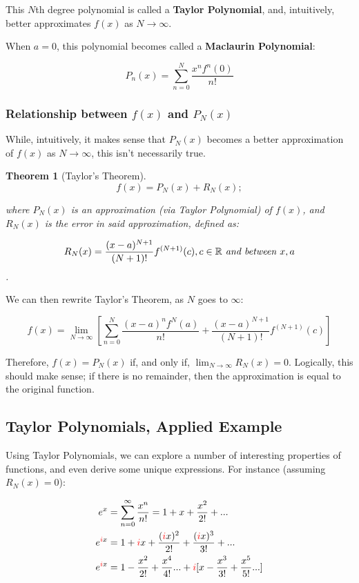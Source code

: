 \documentclass[12pt]{article}
\newtheorem*{theorem}{Theorem}
\begin{document}
This $N$th degree polynomial is called a \textbf{Taylor Polynomial}, and, intuitively, better approximates $f(x)$ as $N \to \infty$.

When $a = 0$, this polynomial becomes called a \textbf{Maclaurin Polynomial}:

$$P_n(x) = \sum_{n=0}^{N} \frac{x^n f^n(0)}{n!}$$

\subsubsection{Relationship between \texorpdfstring{$f(x)$}{a function} and \texorpdfstring{$P_N(x)$}{its approximation}}

While, intuitively, it makes sense that $P_N(x)$ becomes a better approximation of $f(x)$ as $N\to\infty$, this isn't necessarily true.

\begin{theorem}[Taylor's Theorem]
$$f(x) = P_N(x) + R_N(x);$$

where $P_N(x)$ is an approximation (via Taylor Polynomial) of $f(x)$, and $R_N(x)$ is the error in said approximation, defined as:

$$R_N(x) = \frac{(x-a)^{N+1}}{(N+1)!}f^{(N+1)}(c), c \in \mathbb{R} \textit{ and between } x, a$$.
\end{theorem}

We can then rewrite Taylor's Theorem, as $N$ goes to $\infty$:

$$f(x) = \lim_{N\to\infty}[\sum_{n=0}^N \frac{(x-a)^n f^{N}(a)}{n!} + \frac{(x-a)^{N+1}}{(N+1)!} f^{(N+1)}(c)]$$

Therefore, $f(x) = P_N(x)$ if, and only if, $\lim_{N\to\infty} R_N(x) = 0$. Logically, this should make sense; if there is no remainder, then the approximation is equal to the original function.

\subsection{Taylor Polynomials, Applied Example}\label{sec:taylorcomplex}

Using Taylor Polynomials, we can explore a number of interesting properties of functions, and even derive some unique expressions. For instance (assuming $R_N(x) = 0$):

\begin{equation}\label{eqn:taylorexp}
    \begin{split}
    e^x &= \sum_{n=0}^{\infty} \frac{x^n}{n!} = 1 + x + \frac{x^2}{2!} + ...\\
    e^{\textcolor{red}{i}x} &= 1 + \textcolor{red}{i}x + \frac{(\textcolor{red}{i}x)^2}{2!} + \frac{(\textcolor{red}{i}x)^3}{3!} + ...\\
    e^{\textcolor{red}{i}x} &= 1 -\frac{x^2}{2!} + \frac{x^4}{4!}...+\textcolor{red}{i}[x - \frac{x^3}{3!} + \frac{x^5}{5!}...]\\
    \end{split}
\end{equation}
\end{document}
